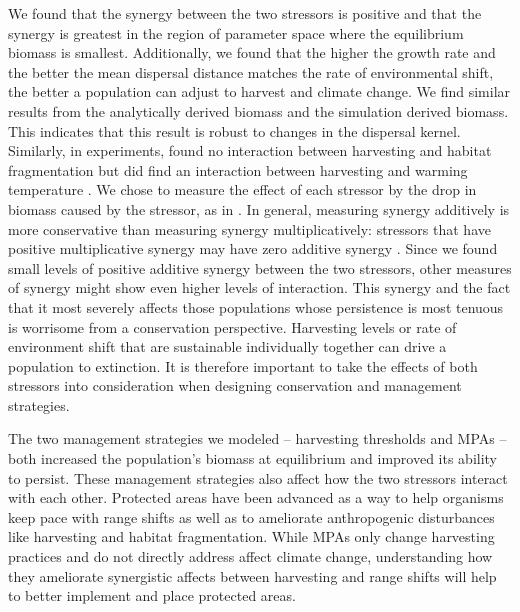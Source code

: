 \documentclass[]{article}
\begin{document}
We found that the synergy between the two stressors is positive and that the synergy is greatest in the region 
of parameter space where the equilibrium biomass is smallest. Additionally, we found that the higher the 
growth rate and the better the mean dispersal distance matches the rate of environmental shift, the better a 
population can adjust to harvest and climate change. We find similar results from the analytically derived 
biomass and the simulation derived biomass. This indicates that this result is robust to changes in the 
dispersal kernel. Similarly, in experiments, \cite{Moraetal2007} found no interaction between harvesting and 
habitat fragmentation but did find an interaction between harvesting and warming temperature \citep
{Moraetal2007}. We chose to measure the effect of each stressor by the drop in biomass caused by the 
stressor, as in \cite{Crainetal2008}. In general, measuring synergy additively is more conservative than 
measuring synergy multiplicatively: stressors that have positive multiplicative synergy may have zero additive 
synergy \citep{Crainetal2008, Foltetal1999}. Since we found small levels of positive additive synergy between 
the two stressors, other measures of synergy might show even higher levels of interaction. This synergy and 
the fact that it most severely affects those populations whose persistence is most tenuous is worrisome from a 
conservation perspective. Harvesting levels or rate of environment shift that are sustainable individually 
together can drive a population to extinction. It is therefore important to take the effects of both stressors into 
consideration when designing conservation and management strategies.

The two management strategies we modeled -- harvesting thresholds and MPAs -- both increased the 
population's biomass at equilibrium and improved its ability to persist. These management strategies also 
affect how the two stressors interact with each other.  Protected areas have 
been advanced as a way to help organisms keep pace with range shifts as well as to ameliorate anthropogenic disturbances like harvesting and habitat fragmentation\citep{Lawleretal2010, 
Hannahetal2007,Botsfordetal2001, Gaylordetal2005, 
HastingsBotsford2003,Thomasetal2012}.  While MPAs only change harvesting practices 
and do not directly address affect climate change, understanding how they ameliorate synergistic affects between harvesting 
and range shifts will help to better implement and place protected areas.
\end{document}
